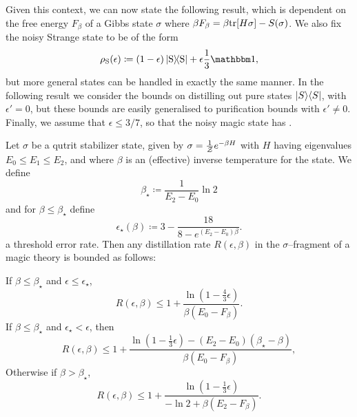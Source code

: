 \documentclass[pra,
aps,
twocolumn,
superscriptaddress,
groupedaddress,
nofootinbib,
reprint
]{revtex4-1}
\begin{document}
Given this context, we can now state the following result, which is dependent on the free energy $F_\beta$ of a Gibbs state $\sigma$ where $ \beta F_\beta =  \beta{\rm{tr}}[H \sigma] - S(\sigma)$. We also fix the noisy Strange state to be of the form 
\begin{equation}
	\rho_{\rm{S}}(\epsilon) \coloneqq (1-\epsilon)\ketbra{\rm{S}} + \epsilon \frac{1}{3}\id,
\end{equation}
but more general states can be handled in exactly the same manner. In the following result we consider the bounds on distilling out pure states $|S\rangle\langle S|$, with $\epsilon'=0$, but these bounds are easily generalised to purification bounds with $\epsilon' \ne 0$. Finally, we assume that $\epsilon \le 3/7$, so that the noisy magic state has .
\begin{theorem}Let $\sigma$ be a qutrit stabilizer state, given by $\sigma = \frac{1}{\mathcal{Z}} e^{-\beta H}$ with $H$ having eigenvalues $E_0 \le E_1 \le E_2$, and where $\beta$ is an (effective) inverse temperature for the state. 
We define
\begin{equation}
	\beta_\star \coloneqq \frac{1}{E_2 - E_0} \ln{2}
\end{equation}
and for $\beta \leq \beta_\star$ define
\begin{equation}
	\epsilon_{\star}(\beta) \coloneqq 3 - \dfrac{18}{8-e^{(E_2 - E_0)\beta}}.
\end{equation}
a threshold error rate. Then any distillation rate $R(\epsilon, \beta)$ in the $\sigma$--fragment of a magic theory is bounded as follows:

If $\beta \leq \beta_{\star}$ and $\epsilon  \leq \epsilon_{\star}$,
\begin{equation}
	R(\epsilon,\beta) \leq 1 + \frac{\ln{\left( 1 - \frac{4}{3}\epsilon \right)}}{\beta (E_0 - F_\beta)}.
\end{equation}
If $\beta \leq \beta_{\star}$ and $\epsilon_{\star} < \epsilon$, then
\begin{equation}
	R(\epsilon, \beta) \le 1 + \frac{\ln{\left(1-\frac{1}{3}\epsilon \right)} - (E_2 - E_0)(\beta_{\star} - \beta)}{\beta (E_0 - F_\beta)},
\end{equation}
Otherwise if $\beta > \beta_{\star}$,
\begin{equation}
	R(\epsilon, \beta) \leq  1+ \frac{\ln{\left(1-\frac{1}{3}\epsilon \right)}}{-\ln{2} + \beta (E_2 - F_\beta)}.
\end{equation}
\end{theorem}
\end{document}
